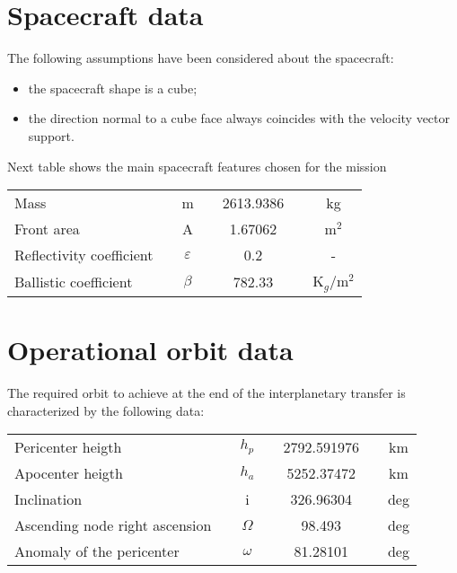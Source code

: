 \section{Spacecraft data}
The following assumptions have been considered about the spacecraft:
\begin{itemize}
\item the spacecraft shape is a cube;
\item the direction normal to a cube face always coincides with the velocity vector support.
\end{itemize}
Next table shows the main spacecraft features chosen for the mission
\begin{table}[!h]
\begin{tabular}{lcccccc}
Mass				&& m 				&& 2613.9386			&& kg\\
Front area 			&& A 				&& 1.67062			&& m$^2$ \\
Reflectivity coefficient 	&& $\varepsilon$	 	&&0.2 				&& -\\
Ballistic coefficient		&&$ \beta $			&& 782.33			&& K$_g$/m$^2$
\end{tabular}
\label{SCf}
\end{table}

\section{Operational orbit data}
The required orbit to achieve at the end of the interplanetary transfer is characterized by the following data:
\begin{table}[h]
\begin{tabular}{lcccccc}
Pericenter heigth 			&&$ h_p $		&& 2792.591976		&& km \\
Apocenter heigth			&& $h_a $		&& 5252.37472		&& km\\
Inclination				&& i 			&& 326.96304			&& deg \\
Ascending node right ascension	&&$ \Omega$ 		&& 98.493			&&deg\\
Anomaly of the pericenter		&&$ \omega $		&& 81.28101			&&deg\\
\end{tabular}
\end{table}



